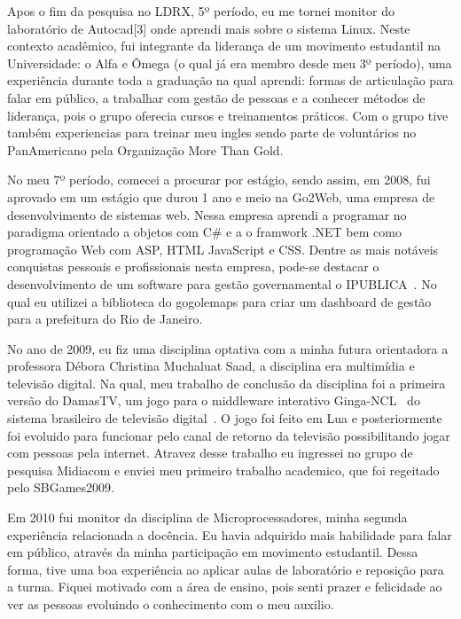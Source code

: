 \documentclass[10pt,a4paper,oneside]{book}
\begin{document}
Apos o fim da pesquisa no LDRX, 5º período, eu me tornei monitor do laboratório de Autocad[3] 
onde aprendi mais sobre o sistema Linux. Neste contexto acadêmico, fui integrante da liderança de um  
movimento estudantil na Universidade: o Alfa e Ômega (o qual já era membro desde meu 3º período), 
uma experiência durante toda a graduação na qual aprendi:  formas de articulação para falar em público, 
a trabalhar com gestão de pessoas e a conhecer métodos de liderança, pois o grupo oferecia cursos e treinamentos práticos.  
Com o grupo tive também experiencias para treinar meu ingles sendo parte de voluntários no PanAmericano pela
Organização More Than Gold.

No meu 7º período, comecei a procurar por estágio, sendo assim, em 2008, fui aprovado em um estágio 
que durou 1 ano e meio na Go2Web, uma empresa de desenvolvimento de sistemas web. Nessa
empresa aprendi a programar no paradigma orientado a objetos com C# e a o framwork .NET bem como 
programação Web com ASP, HTML JavaScript e CSS.
Dentre as mais notáveis conquistas pessoais e profissionais nesta empresa, pode-se destacar o 
desenvolvimento de um software para gestão governamental o IPUBLICA~\cite{ipu_sistema_gestao}.
No qual eu utilizei a biblioteca do gogolemaps para criar um dashboard de gestão para a prefeitura 
do Rio de Janeiro.

No ano de 2009, eu fiz uma disciplina optativa com a minha futura orientadora a professora 
Débora Christina Muchaluat Saad, a disciplina era multimídia e televisão digital. Na qual,
meu trabalho de conclusão da disciplina foi a primeira versão do DamasTV, um jogo para o middleware 
interativo Ginga-NCL~\cite{soares2007ginga} do sistema brasileiro de televisão digital~\cite{mendes2007sbtvd}. 
O jogo foi feito em Lua e posteriormente foi evoluido para funcionar pelo canal de retorno da televisão
possibilitando jogar com pessoas pela internet.
Atravez desse trabalho eu ingressei no grupo de pesquisa Midiacom e enviei meu primeiro trabalho academico,
que foi regeitado pelo SBGames2009.

Em 2010 fui monitor da disciplina de Microprocessadores,  minha segunda experiência 
relacionada a docência. Eu havia adquirido mais habilidade para falar em público, através da minha 
participação em movimento estudantil. Dessa forma,  tive uma boa experiência ao aplicar aulas de 
laboratório e reposição para a turma. Fiquei motivado com a área de ensino, pois senti prazer e 
felicidade ao ver as pessoas evoluindo o conhecimento com o meu auxilio. 
\end{document}

